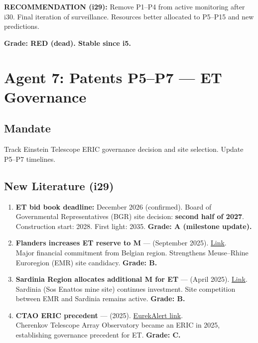 \documentclass[11pt,a4paper]{article}
\begin{document}
\textbf{RECOMMENDATION (i29):} Remove P1--P4 from active monitoring after i30. Final iteration of surveillance. Resources better allocated to P5--P15 and new predictions.

\textbf{Grade: RED (dead). Stable since i5.}

\section{Agent 7: Patents P5--P7 --- ET Governance}

\subsection{Mandate}
Track Einstein Telescope ERIC governance decision and site selection. Update P5--P7 timelines.

\subsection{New Literature (i29)}

\begin{enumerate}
\item \textbf{ET bid book deadline:} December 2026 (confirmed). Board of Governmental Representatives (BGR) site decision: \textbf{second half of 2027}. Construction start: 2028. First light: 2035. \textbf{Grade: A (milestone update).}

\item \textbf{Flanders increases ET reserve to M} --- (September 2025). \href{https://www.einsteintelescope-emr.eu/en/2025/09/22/flanders-increases-einstein-telescope-reserve-to-500-million-euros/}{Link}.\\
Major financial commitment from Belgian region. Strengthens Meuse--Rhine Euroregion (EMR) site candidacy. \textbf{Grade: B.}

\item \textbf{Sardinia Region allocates additional M for ET} --- (April 2025). \href{https://www.einstein-telescope.it/en/2025/04/07/the-sardinia-region-allocates-another-e20-million-for-the-einstein-telescope/}{Link}.\\
Sardinia (Sos Enattos mine site) continues investment. Site competition between EMR and Sardinia remains active. \textbf{Grade: B.}

\item \textbf{CTAO ERIC precedent} --- (2025). \href{https://www.eurekalert.org/news-releases/1069629}{EurekAlert link}.\\
Cherenkov Telescope Array Observatory became an ERIC in 2025, establishing governance precedent for ET. \textbf{Grade: C.}
\end{enumerate}
\end{document}
